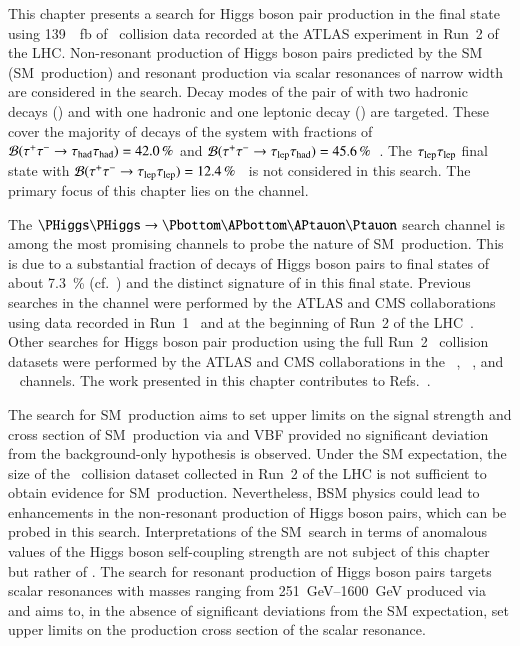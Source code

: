 This chapter presents a search for Higgs boson pair production in the \bbtautau
final state using \SI{139}{\per\femto\barn} of \pp~collision data recorded at
the ATLAS experiment in Run~2 of the LHC. Non-resonant production of Higgs
boson pairs predicted by the SM (SM~\HH production) and resonant production via
scalar resonances of narrow width are considered in the search. Decay modes of
the pair of \tauleptons with two hadronic \taulepton decays (\hadhad) and with
one hadronic and one leptonic \taulepton decay (\lephad) are targeted. These
cover the majority of decays of the \tautau system with fractions of
$\mathcal{B}(\tau^{+} \tau^{-} \to \tau_{\text{had}}\tau_{\text{had}}) = \SI{42.0}{\percent}$ and
$\mathcal{B}(\tau^{+} \tau^{-} \to \tau_{\text{lep}}\tau_{\text{had}}) =
\SI{45.6}{\percent}$~\cite{Zyla:2020zbs}. The $\tau_{\text{lep}}\tau_{\text{lep}}$ final state with
$\mathcal{B}(\tau^{+} \tau^{-} \to \tau_{\text{lep}}\tau_{\text{lep}}) =
\SI{12.4}{\percent}$~\cite{Zyla:2020zbs} is not considered in this search. The
primary focus of this chapter lies on the \hadhad channel.

The $\HH \to \bbtautau$ search channel is among the most promising channels to
probe the nature of SM~\HH production. This is due to a substantial fraction of
decays of Higgs boson pairs to \bbtautau final states of about
\SI{7.3}{\percent} (cf.~) and the distinct
signature of \tauleptons in this final state. Previous searches in the \bbtautau
channel were performed by the ATLAS and CMS collaborations using data recorded
in Run~1~\cite{HIGG-2013-33,CMS-HIG-15-013} and at the beginning of Run~2 of the
LHC~\cite{HIGG-2016-16-witherratum,CMS-HIG-17-002}.  Other searches for Higgs
boson pair production using the full Run~2 \pp~collision datasets were performed
by the ATLAS and CMS collaborations in the \bbtautau~\cite{CMS-HIG-20-010},
\bbbb~\cite{HDBS-2019-29,CMS-HIG-20-005}, and
\bbyy~\cite{HDBS-2018-34,CMS-HIG-19-018} channels.
The work presented in this chapter contributes to
Refs.~\cite{ATLAS-CONF-2021-030,HDBS-2018-40}.

The search for SM~\HH production aims to set upper limits on the signal strength
and cross section of SM~\HH production via \ggF and VBF provided no significant
deviation from the background-only hypothesis is observed. Under the SM
expectation, the size of the \pp~collision dataset collected in Run~2 of the LHC
is not sufficient to obtain evidence for SM~\HH production.  Nevertheless, BSM
physics could lead to enhancements in the non-resonant production of Higgs boson
pairs, which can be probed in this search.
Interpretations of the SM~\HH search in terms of anomalous values of the Higgs
boson self-coupling strength are not subject of this chapter but rather of
. The search for resonant production of Higgs
boson pairs targets scalar resonances with masses ranging from
\SIrange{251}{1600}{\GeV} produced via \ggF and aims to, in the absence of
significant deviations from the SM expectation, set upper limits on the
production cross section of the scalar resonance.


